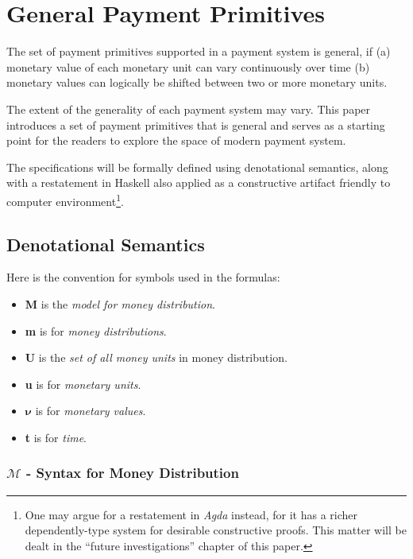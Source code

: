 \chapter{General Payment Primitives}

The set of payment primitives supported in a payment system is general, if (a) monetary value of
each monetary unit can vary continuously over time (b) monetary values can logically be shifted
between two or more monetary units.

The extent of the generality of each payment system may vary. This paper introduces a set of payment
primitives that is general and serves as a starting point for the readers to explore the space of
modern payment system.

The specifications will be formally defined using denotational semantics, along with a restatement
in Haskell also applied as a constructive artifact friendly to computer environment\footnote{One may
argue for a restatement in \textit{Agda} instead, for it has a richer dependently-type system for
desirable constructive proofs. This matter will be dealt in the ``future investigations'' chapter of
this paper.}.

\section{Denotational Semantics}

Here is the convention for symbols used in the formulas:

\begin{itemize}
\item \textbf{M} is the \textit{model for money distribution}.
\item \textbf{m} is for \textit{money distributions}.
\item \textbf{U} is the \textit{set of all money units} in money distribution.
\item \textbf{u} is for \textit{monetary units}.
\item $\boldsymbol{\nu}$ is for \textit{monetary values}.
\item \textbf{t} is for \textit{time}.
\end{itemize}

\subsection{$\mathcal{M}$ - Syntax for Money Distribution}

